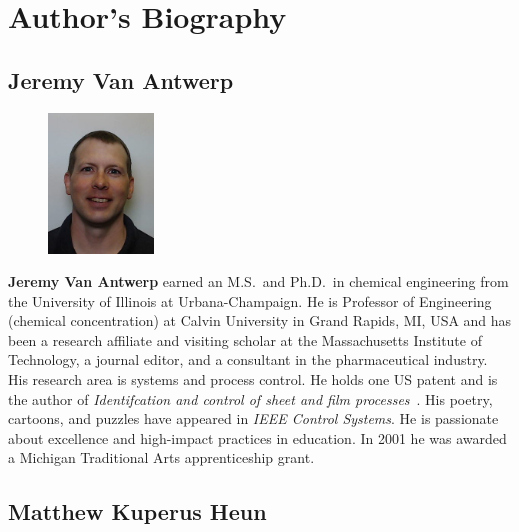 

\chapter*{Author's Biography}


\section*{Jeremy Van Antwerp}

\setlength{\intextsep}{-7pt}%
\setlength{\columnsep}{8pt}%
\begin{figure}
  \begin{center}
    \includegraphics[width=0.25\textwidth]{headshots/jva-headshot.jpeg}
  \end{center}
\end{figure}
\textbf{Jeremy Van Antwerp} earned an M.S.\ and Ph.D.\ in chemical engineering 
from the University of Illinois at Urbana-Champaign. 
He is Professor of Engineering (chemical concentration)
at Calvin University in Grand Rapids, MI, USA
and has been a research affiliate and visiting scholar at the Massachusetts 
Institute of Technology, a journal editor, and a consultant in the pharmaceutical 
industry.
His research area is systems and process control.
He holds one US patent and is the author of \emph{Identifcation and control of 
sheet and film processes}~\cite{FeaVB2000}.
His poetry, cartoons, and puzzles have appeared in \emph{IEEE Control Systems}.
He is passionate about excellence and high-impact practices in education.
In 2001 he was awarded a Michigan Traditional Arts apprenticeship grant.


\section*{Matthew Kuperus Heun}

